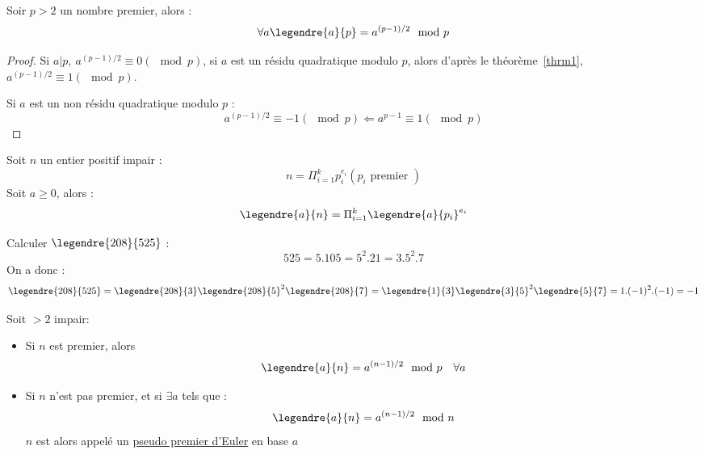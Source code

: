 \documentclass[a4paper, 10pt]{thesis}
\begin{document}
\begin{thrm}
    Soir $p > 2$ un nombre premier, alors : \begin{displaymath}
        \forall a \legendre{a}{p} = a^{(p-1)/2} \mod p
    \end{displaymath}
\end{thrm}

\begin{proof}
    Si $a | p,\ a^{(p-1) / 2} \equiv 0 (\mod p)$, si $a$ est un résidu quadratique modulo $p$, alors
    d'après le théorème~\ref{thrm1}, $a^{(p-1) / 2} \equiv 1 (\mod p)$.

    Si $a$ est un non résidu quadratique modulo $p$ : \begin{displaymath}
        a^{(p-1)/2} \equiv -1 (\mod p) \Leftarrow a^{p-1} \equiv 1 (\mod p)
    \end{displaymath}
\end{proof}

\begin{df}
    Soit $n$ un entier positif impair :
    \begin{displaymath}
        n = \Pi_{i = 1}^k p_i^{e_i} (p_i \mbox{ premier })
    \end{displaymath}
    Soit $a \geq 0$, alors : \begin{displaymath}
        \legendre{a}{n} = \Pi_{i=1}^k \legendre{a}{p_i}^{e_i}
    \end{displaymath}
\end{df}

\begin{ex}
    Calculer $\legendre{208}{525}$ : \\
    \begin{displaymath}
        525 = 5 . 105 = 5^2 . 21 = 3 . 5^2 . 7 
    \end{displaymath}
    On a donc :\begin{displaymath}
        \legendre{208}{525} = \legendre{208}{3} \legendre{208}{5}^2 \legendre{208}{7} = 
        \legendre{1}{3} \legendre{3}{5}^2 \legendre{5}{7} = 1 . (-1)^2 . (-1) = -1
    \end{displaymath}
\end{ex}

\begin{prop}
    Soit $ > 2$ impair: \begin{itemize}
        \item Si $n$ est premier, alors \begin{displaymath}
                \legendre{a}{n} = a^{(n-1)/2} \mod p \quad \forall a
            \end{displaymath}
        \item Si $n$ n'est pas premier, et si $\exists a$ tels que :
            \begin{displaymath}
                \legendre{a}{n} = a^{(n-1)/2} \mod n
            \end{displaymath}
            $n$ est alors appelé un \underline{pseudo premier d'Euler} en base $a$
    \end{itemize}
\end{prop}
\end{document}
